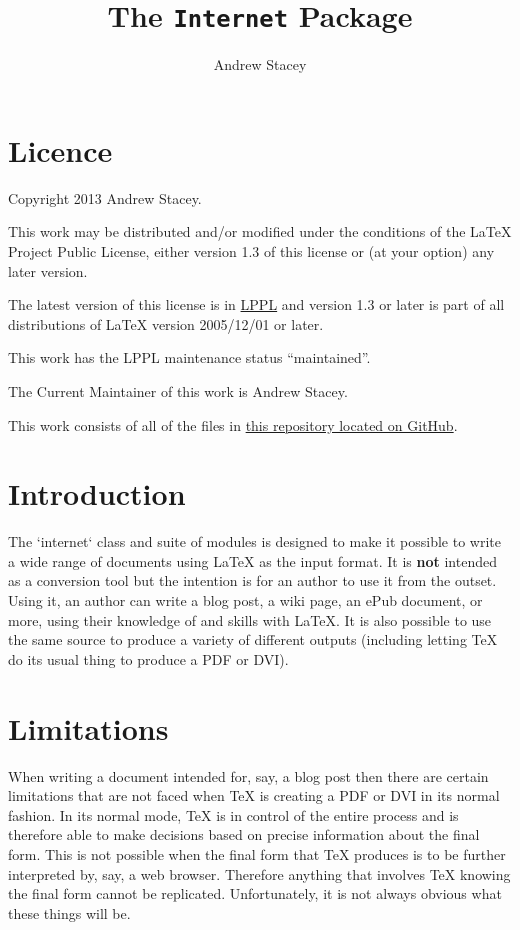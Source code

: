\documentclass[github,text]{internet}
\title{The \texttt{Internet} Package}
\author{Andrew Stacey}
\begin{document}
\maketitle

\section{Licence}

Copyright 2013 Andrew Stacey.

This work may be distributed and/or modified under the conditions of the LaTeX Project Public License, either version 1.3 of this license or (at your option) any later version.

The latest version of this license is in \href{http://www.latex-project.org/lppl.txt}{LPPL} and version 1.3 or later is part of all distributions of LaTeX version 2005/12/01 or later.

This work has the LPPL maintenance status ``maintained''.

The Current Maintainer of this work is Andrew Stacey.


This work consists of all of the files in  \href{https://github.com/loopspace/latex-to-internet}{this repository located on GitHub}.

\section{Introduction}

The `internet` class and suite of modules is designed to make it possible to write a wide range of documents using \LaTeX{} as the input format.
It is \textbf{not} intended as a conversion tool but the intention is for an author to use it from the outset.
Using it, an author can write a blog post, a wiki page, an ePub document, or more, using their knowledge of and skills with \LaTeX{}.
It is also possible to use the same source to produce a variety of different outputs (including letting \TeX{} do its usual thing to produce a PDF or DVI).

\section{Limitations}

When writing a document intended for, say, a blog post then there are certain limitations that are not faced when \TeX{} is creating a PDF or DVI in its normal fashion.
In its normal mode, \TeX{} is in control of the entire process and is therefore able to make decisions based on precise information about the final form.
This is not possible when the final form that \TeX{} produces is to be further interpreted by, say, a web browser.
Therefore anything that involves \TeX{} knowing the final form cannot be replicated.
Unfortunately, it is not always obvious what these things will be.
\end{document}
